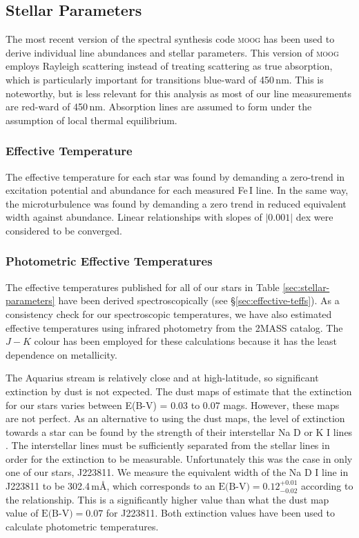 \documentclass{emulateapj}
\begin{document}
\subsection{Stellar Parameters}
The most recent version of the spectral synthesis code \textsc{moog} \citep{sneden;et-al_1973} has been used to derive individual line abundances and stellar parameters. This version of \textsc{moog} employs Rayleigh scattering \citep{sobeck;et-al_2011} instead of treating scattering as true absorption, which is particularly important for transitions blue-ward of 450\,nm. This is noteworthy, but is less relevant for this analysis as most of our line measurements are red-ward of 450\,nm. Absorption lines are assumed to form under the assumption of local thermal equilibrium. 

\subsubsection{Effective Temperature}
The effective temperature for each star was found by demanding a zero-trend in excitation potential and abundance for each measured Fe\,I line. In the same way, the microturbulence was found by demanding a zero trend in reduced equivalent width against abundance. Linear relationships with slopes of $|0.001|$ dex were considered to be converged. 

\subsubsection{Photometric Effective Temperatures}
\label{sec:photometric-temperatures}

The effective temperatures published for all of our stars in Table \ref{sec:stellar-parameters} have been derived spectroscopically (see \S\ref{sec:effective-teffs}). As a consistency check for our spectroscopic temperatures, we have also estimated effective temperatures using infrared photometry from the 2MASS catalog. The $J-K$ colour has been employed for these calculations because it has the least dependence on metallicity. 

The Aquarius stream is relatively close and at high-latitude, so significant extinction by dust is not expected. The dust maps of \citet{schlegel;et-al_1998} estimate that the extinction for our stars varies between E(B-V) = 0.03 to 0.07 mags. However, these maps are not perfect. As an alternative to using the \citet{schlegel;et-al_1998} dust maps, the level of extinction towards a star can be found by the strength of their interstellar Na D or K \textsc{I} lines \citep{munari;zwitter_1997}. The interstellar lines must be sufficiently separated from the stellar lines in order for the extinction to be measurable. Unfortunately this was the case in only one of our stars, J223811. We measure the equivalent width of the Na D \textsc{I} line in J223811 to be 302.4\,m{\AA}, which corresponds to an $\mbox{E(B-V)} = 0.12^{+0.01}_{-0.02}$ according to the \citet{munari;zwitter_1997} relationship. This is a significantly higher value than what the \citet{schlegel;et-al_1998} dust map value of $\mbox{E(B-V)} = 0.07$ for J223811. Both extinction values have been used to calculate photometric temperatures. 
\end{document}
